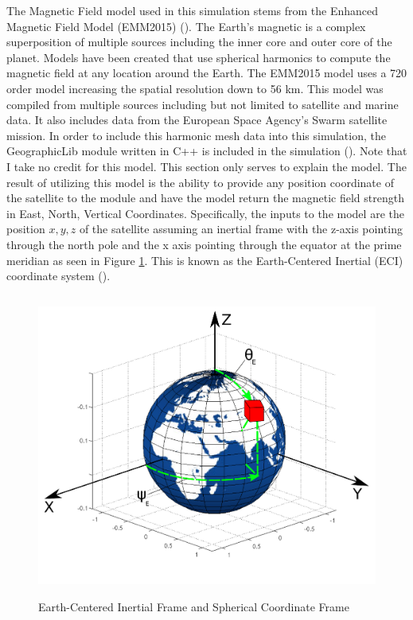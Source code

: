 \documentclass{article}
\begin{document}
The Magnetic Field model used in this simulation stems from the
Enhanced Magnetic Field Model (EMM2015) (\cite{EMM2015}). The Earth's magnetic is a
complex superposition of multiple sources including the inner core and
outer core of the planet. Models have been created that use spherical
harmonics to compute the magnetic field at any location around the
Earth. The EMM2015 model uses a 720 order model increasing the spatial
resolution down to 56 km. This model was compiled from multiple
sources including but not limited to satellite and marine data. It
also includes data from the European Space Agency's Swarm satellite
mission. In order to include this harmonic mesh data into this simulation,
the GeographicLib module written in C++ is included in the
simulation (\cite{GeographicLib}). Note that I take no credit for this
model. This section only serves to explain the model. The result of
utilizing this model is the ability to provide any position coordinate
of the satellite to the module and have
the model return the magnetic field strength in East, North, Vertical
Coordinates. Specifically, the inputs to the model are 
the position $x,y,z$ of the satellite assuming an inertial frame with
the z-axis pointing through the north pole and the x axis pointing
through the equator at the prime meridian as seen in Figure
\ref{f:spherical}. This is known as the Earth-Centered Inertial
(ECI) coordinate system (\cite{ECI}).
\begin{figure}[H]
  \begin{center}
  \includegraphics[height=100mm, width=120mm]{Figures/ECI.pdf}
  \end{center}
  \caption{Earth-Centered Inertial Frame and Spherical Coordinate Frame}\label{f:spherical}
\end{figure}
\end{document}
